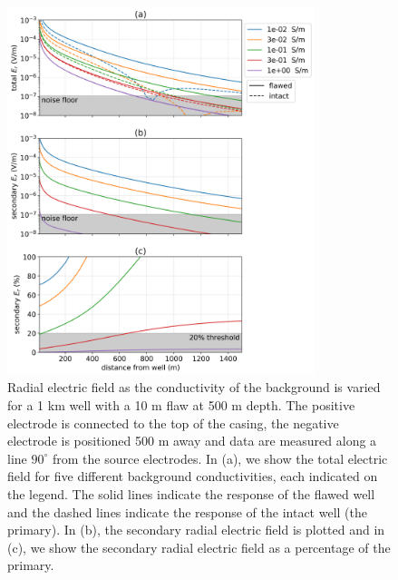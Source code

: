 \begin{figure}
    \begin{center}
    \includegraphics[width=0.8\textwidth]{figures/dc_casing/integrity_conductivity.png}
    \end{center}
\caption{
    Radial electric field as the conductivity of the background is varied for a 1 km well with a 10 m flaw at 500 m depth.
    The positive electrode is connected to the top of the casing, the negative electrode
    is positioned 500 m away and data are measured along a line $90^\circ$ from the
    source electrodes. In (a), we show the total electric field for five different background conductivities,
    each indicated on the legend. The solid lines indicate the response of the flawed well and the dashed lines indicate the response of the intact well (the primary).
    In (b), the secondary radial electric field is plotted and in (c), we show the
    secondary radial electric field as a percentage of the primary.
}
\label{fig:integrity_conductivity}
\end{figure}
